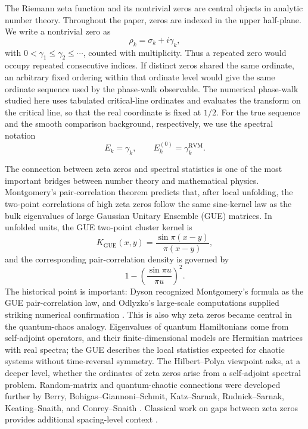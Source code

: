 \documentclass[12pt]{article}
\numberwithin{equation}{section}
\newcommand{\RVM}{\mathrm{RVM}}
\newcommand{\GUE}{\mathrm{GUE}}
\begin{document}
The Riemann zeta function and its nontrivial zeros are central objects in analytic number theory.  Throughout the paper, zeros are indexed in the upper half-plane.  We write a nontrivial zero as
\begin{equation}
\rho_k=\sigma_k+i\gamma_k,
\label{eq:introduction_zero_definition}
\end{equation}
with \(0<\gamma_1\leq\gamma_2\leq\cdots\), counted with multiplicity.  Thus a repeated zero would occupy repeated consecutive indices.  If distinct zeros shared the same ordinate, an arbitrary fixed ordering within that ordinate level would give the same ordinate sequence used by the phase-walk observable.  The numerical phase-walk studied here uses tabulated critical-line ordinates and evaluates the transform on the critical line, so that the real coordinate is fixed at \(1/2\).  For the true sequence and the smooth comparison background, respectively, we use the spectral notation
\begin{equation}
E_k=\gamma_k,
\qquad
E_k^{(0)}=\gamma_k^{\RVM}.
\label{eq:introduction_energy_identification}
\end{equation}

The connection between zeta zeros and spectral statistics is one of the most important bridges between number theory and mathematical physics.  Montgomery's pair-correlation theorem predicts that, after local unfolding, the two-point correlations of high zeta zeros follow the same sine-kernel law as the bulk eigenvalues of large Gaussian Unitary Ensemble (GUE) matrices.  In unfolded units, the GUE two-point cluster kernel is
\begin{equation}
K_{\GUE}(x,y)
=
\frac{\sin \pi(x-y)}{\pi(x-y)},
\label{eq:introduction_gue_sine_kernel}
\end{equation}
and the corresponding pair-correlation density is governed by
\begin{equation}
1-\left(\frac{\sin \pi u}{\pi u}\right)^2.
\label{eq:introduction_montgomery_pair_density}
\end{equation}
The historical point is important: Dyson recognized Montgomery's formula as the GUE pair-correlation law, and Odlyzko's large-scale computations supplied striking numerical confirmation \cite{Montgomery1973,Odlyzko1987,Mehta2004}.  This is also why zeta zeros became central in the quantum-chaos analogy.  Eigenvalues of quantum Hamiltonians come from self-adjoint operators, and their finite-dimensional models are Hermitian matrices with real spectra; the GUE describes the local statistics expected for chaotic systems without time-reversal symmetry.  The Hilbert--Polya viewpoint asks, at a deeper level, whether the ordinates of zeta zeros arise from a self-adjoint spectral problem.  Random-matrix and quantum-chaotic connections were developed further by Berry, Bohigas--Giannoni--Schmit, Katz--Sarnak, Rudnick--Sarnak, Keating--Snaith, and Conrey--Snaith \cite{Berry1986,BohigasGiannoniSchmit1984,KatzSarnak1999,RudnickSarnak1996,KeatingSnaith2000,ConreySnaith2008}.  Classical work on gaps between zeta zeros provides additional spacing-level context \cite{ConreyGhoshGoldstonGonekHeathBrown1985,Soundararajan1996}.
\end{document}
